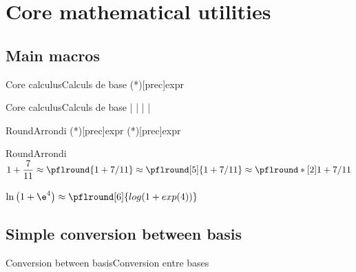 \documentclass[a4paper,english,11pt]{article}
\begin{document}
\newpage

\section{Core mathematical utilities}

\subsection{Main macros}

\begin{myprestexcode}{Core calculus}{Calculs de base}
\pflnum(*)[prec]{expr}

% 
\end{myprestexcode}

\begin{myprestex}{Core calculus}{Calculs de base}
 | 
 | 
 | 
 | 
 
\end{myprestex}

\begin{myprestexcode}{Round}{Arrondi}
\pflround(*)[prec]{expr}
\pflarrondi(*)[prec]{expr}

\end{myprestexcode}

\begin{myprestex}{Round}{Arrondi}
$1+\dfrac{7}{11} \approx \pflround{1+7/11} \approx \pflround[5]{1+7/11} \approx
\pflround*[2]{1+7/11}$

$\ln\big(1+\e^{4}\big) \approx \pflround[6]{log(1+exp(4))}$
\end{myprestex}

\subsection{Simple conversion between basis}

\begin{myprestexcode}{Conversion between basis}{Conversion entre bases}
\end{myprestexcode}
\end{document}

